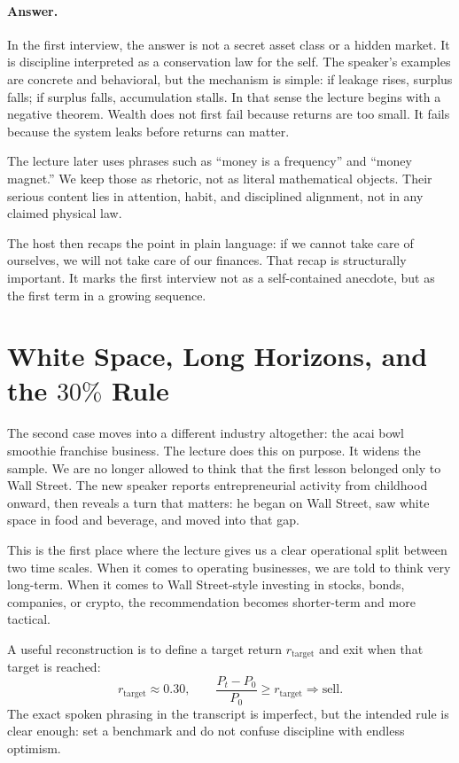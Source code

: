 \paragraph{Answer.} In the first interview, the answer is not a secret asset class or a hidden market. It is discipline interpreted as a conservation law for the self. The speaker's examples are concrete and behavioral, but the mechanism is simple: if leakage rises, surplus falls; if surplus falls, accumulation stalls. In that sense the lecture begins with a negative theorem. Wealth does not first fail because returns are too small. It fails because the system leaks before returns can matter.

\begin{remark}
The lecture later uses phrases such as ``money is a frequency'' and ``money magnet.'' We keep those as rhetoric, not as literal mathematical objects. Their serious content lies in attention, habit, and disciplined alignment, not in any claimed physical law.
\end{remark}

The host then recaps the point in plain language: if we cannot take care of ourselves, we will not take care of our finances. That recap is structurally important. It marks the first interview not as a self-contained anecdote, but as the first term in a growing sequence.

\section{White Space, Long Horizons, and the \(30\%\) Rule}

The second case moves into a different industry altogether: the acai bowl smoothie franchise business. The lecture does this on purpose. It widens the sample. We are no longer allowed to think that the first lesson belonged only to Wall Street. The new speaker reports entrepreneurial activity from childhood onward, then reveals a turn that matters: he began on Wall Street, saw white space in food and beverage, and moved into that gap.

This is the first place where the lecture gives us a clear operational split between two time scales. When it comes to operating businesses, we are told to think very long-term. When it comes to Wall Street-style investing in stocks, bonds, companies, or crypto, the recommendation becomes shorter-term and more tactical.

A useful reconstruction is to define a target return \(r_{\text{target}}\) and exit when that target is reached:
\begin{equation}
r_{\text{target}} \approx 0.30,
\qquad
\frac{P_t - P_0}{P_0} \ge r_{\text{target}}
\Longrightarrow
\text{sell}.
\end{equation}
The exact spoken phrasing in the transcript is imperfect, but the intended rule is clear enough: set a benchmark and do not confuse discipline with endless optimism.

